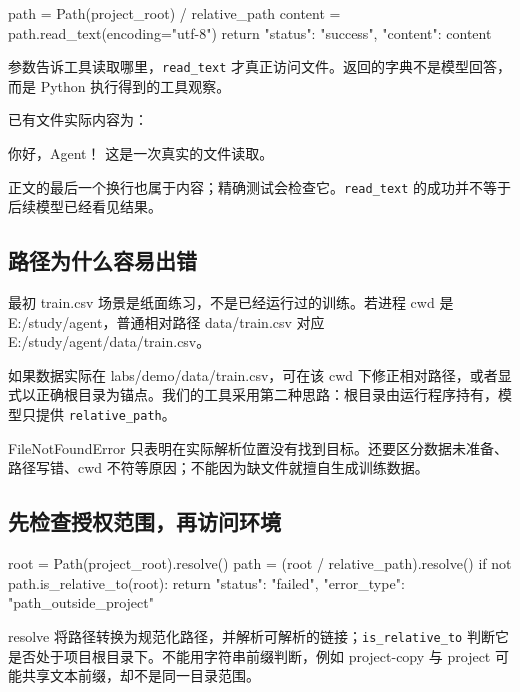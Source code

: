 \begin{Code}
path = Path(project_root) / relative_path
content = path.read_text(encoding="utf-8")
return {"status": "success", "content": content}
\end{Code}

参数告诉工具读取哪里，\nolinkurl{read_text} 才真正访问文件。返回的字典不是模型回答，而是 Python 执行得到的工具观察。

已有文件实际内容为：

\begin{Code}
你好，Agent！
这是一次真实的文件读取。
\end{Code}

正文的最后一个换行也属于内容；精确测试会检查它。\nolinkurl{read_text} 的成功并不等于后续模型已经看见结果。

\subsection{路径为什么容易出错}

最初 train.csv 场景是纸面练习，不是已经运行过的训练。若进程 cwd 是 E:/study/agent，普通相对路径 data/train.csv 对应 E:/study/agent/data/train.csv。

如果数据实际在 labs/demo/data/train.csv，可在该 cwd 下修正相对路径，或者显式以正确根目录为锚点。我们的工具采用第二种思路：根目录由运行程序持有，模型只提供 \nolinkurl{relative_path}。

FileNotFoundError 只表明在实际解析位置没有找到目标。还要区分数据未准备、路径写错、cwd 不符等原因；不能因为缺文件就擅自生成训练数据。

\subsection{先检查授权范围，再访问环境}

\begin{Code}
root = Path(project_root).resolve()
path = (root / relative_path).resolve()
if not path.is_relative_to(root):
    return {"status": "failed", "error_type": "path_outside_project"}
\end{Code}

resolve 将路径转换为规范化路径，并解析可解析的链接；\nolinkurl{is_relative_to} 判断它是否处于项目根目录下。不能用字符串前缀判断，例如 project-copy 与 project 可能共享文本前缀，却不是同一目录范围。

